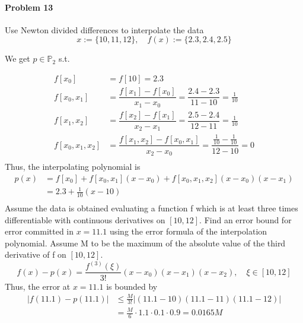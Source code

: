 \documentclass[../main.tex]{subfiles}
\begin{document}
\paragraph*{Problem 13}
Use Newton divided differences to interpolate the data
\[
    x:= \{10, 11, 12\}, \quad     f(x):=\{2.3, 2.4, 2.5\}
\]

We get $p \in \mathbb{P}_2$ s.t.

\begin{align*}
    f[x_0] &= f[10] = 2.3\\
    f[x_0,x_1] &= \dfrac{f[x_1] - f[x_0]}{x_1 - x_0} = \dfrac{2.4-2.3}{11-10} = \frac{1}{10}\\
    f[x_1,x_2] &= \dfrac{f[x_2] - f[x_1]}{x_2 - x_1} = \dfrac{2.5-2.4}{12-11} = \frac{1}{10}\\
    f[x_0,x_1,x_2] &= \dfrac{f[x_1,x_2] - f[x_0,x_1]}{x_2 - x_0} = \dfrac{\frac{1}{10} - \frac{1}{10}}{12-10} = 0\\
\end{align*}
Thus, the interpolating polynomial is
\begin{align*}
    p(x) &= f[x_0] + f[x_0,x_1](x - x_0) + f[x_0,x_1,x_2](x - x_0)(x - x_1)\\
    &= 2.3 + \frac{1}{10}(x - 10)\\
\end{align*}
Assume the data is obtained evaluating a function f which is at least three
times differentiable with continuous derivatives on $[10, 12]$. Find an error
bound for error committed in $x = 11.1$ using the error formula of the
interpolation polynomial. Assume M to be the maximum of the absolute
value of the third derivative of f on $[10, 12]$.
\[
    f(x) - p(x) = \frac{f^{(3)}(\xi)}{3!}(x - x_0)(x - x_1)(x - x_2), \quad \xi \in [10, 12]
\]
Thus, the error at $x = 11.1$ is bounded by
\begin{align*}
    |f(11.1) - p(11.1)| &\leq \frac{M}{3!}|(11.1 - 10)(11.1 - 11)(11.1 - 12)|\\
    &= \frac{M}{6} \cdot 1.1 \cdot 0.1 \cdot 0.9 = 0.0165M
\end{align*}
\end{document}

